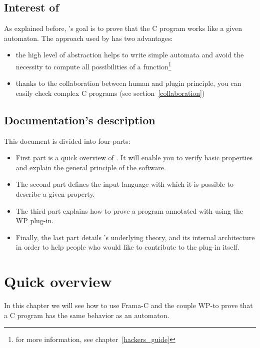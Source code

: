 \documentclass{frama-c-book}
\begin{document}
\section{Interest of \aorai}

As explained before, \aorai 's goal is to prove that the C program
works like a given automaton. The approach used by \aorai has two
advantages:
\begin{itemize}
\item the high level of abstraction helps to write simple automata and
  avoid the necessity to compute all possibilities of a
  function\footnote{for more information, see
    chapter~\ref{hackers_guide}}
\item thanks to the collaboration between human and plugin principle,
  you can easily check complex C programs (see
  section~\ref{collaboration})
\end{itemize}

\section{Documentation's description}

This document is divided into four parts:
\begin{itemize}
\item First part is a quick overview of \aorai. It will enable you to
  verify basic properties and explain the general principle of the
  software.
\item The second part defines the \aorai input language with which it is
possible to describe a given property.
\item The third part explains how to prove a program annotated with \aorai
using the WP plug-in.
\item Finally, the last part details \aorai's underlying theory, and its
internal architecture in order to help people who would like to contribute to
the plug-in itself.
\end{itemize}

\chapter{Quick overview}

In this chapter we will see how to use Frama-C and the couple
WP-\aorai to prove that a C program has the same behavior as
an automaton.
\end{document}
